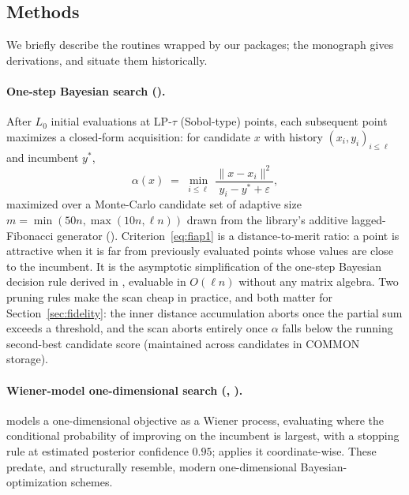 \subsection{Methods}
\label{sec:methods}

We briefly describe the routines wrapped by our packages; the monograph
\cite{mockus1989bayesian} gives derivations, and
\cite{torn1989global,zilinskas2016stochastic} situate them historically.

\paragraph{One-step Bayesian search ().}
After $L_0$ initial evaluations at LP-$\tau$ (Sobol-type) points, each
subsequent point maximizes a closed-form acquisition: for candidate $x$
with history $(x_i, y_i)_{i\le\ell}$ and incumbent $y^*$,
\begin{equation}
\alpha(x) \;=\; \min_{i\le \ell}\;
\frac{\lVert x - x_i\rVert^2}{\,y_i - y^* + \varepsilon\,},
\label{eq:fiap1}
\end{equation}
maximized over a Monte-Carlo candidate set of adaptive size
$m=\min(50n,\max(10n,\ell n))$ drawn from the library's additive
lagged-Fibonacci generator (). Criterion~\eqref{eq:fiap1} is a
distance-to-merit ratio: a point is attractive when it is far from
previously evaluated points whose values are close to the incumbent. It
is the asymptotic simplification of the one-step Bayesian decision rule
derived in \cite{mockus1978application}, evaluable in $O(\ell n)$ without
any matrix algebra. Two pruning rules make the scan cheap in practice,
and both matter for Section~\ref{sec:fidelity}: the inner distance
accumulation aborts once the partial sum exceeds a threshold, and the
scan aborts entirely once $\alpha$ falls below the running second-best
candidate score (maintained across candidates in COMMON storage).

\paragraph{Wiener-model one-dimensional search (,
).}  models a one-dimensional objective as a
Wiener process, evaluating where the conditional probability of improving
on the incumbent is largest, with a stopping rule at estimated posterior
confidence $0.95$;  applies it coordinate-wise. These
predate, and structurally resemble, modern one-dimensional
Bayesian-optimization schemes.

